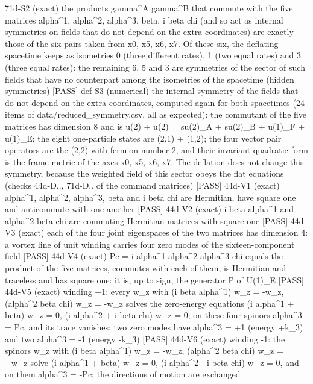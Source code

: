 \documentclass[
  10pt,
]{article}
\newenvironment{Shaded}{}{}
\newcommand{\NormalTok}[1]{#1}
\begin{document}
\begin{Shaded}
\begin{Highlighting}[]
\NormalTok{[PASS] 71d{-}S2  (exact) the products gamma\^{}A gamma\^{}B that commute with the five matrices alpha\^{}1, alpha\^{}2, alpha\^{}3, beta, i beta chi (and so act as internal symmetries on fields that do not depend on the extra coordinates) are exactly those of the six pairs taken from x0, x5, x6, x7. Of these six, the deflating spacetime keeps as isometries 0 (three different rates), 1 (two equal rates) and 3 (three equal rates): the remaining 6, 5 and 3 are symmetries of the sector of such fields that have no counterpart among the isometries of the spacetime (hidden symmetries)}
\NormalTok{[PASS] def{-}S3  (numerical) the internal symmetry of the fields that do not depend on the extra coordinates, computed again for both spacetimes (24 items of data/reduced\_symmetry.csv, all as expected): the commutant of the five matrices has dimension 8 and is u(2) + u(2) = su(2)\_A + su(2)\_B + u(1)\_F + u(1)\_E; the eight one{-}particle states are (2,1) + (1,2); the four vector pair operators are the (2,2) with fermion number 2, and their invariant quadratic form is the frame metric of the axes x0, x5, x6, x7. The deflation does not change this symmetry, because the weighted field of this sector obeys the flat equations (checks 44d{-}D.., 71d{-}D.. of the command matrices)}
\NormalTok{[PASS] 44d{-}V1  (exact) alpha\^{}1, alpha\^{}2, alpha\^{}3, beta and i beta chi are Hermitian, have square one and anticommute with one another}
\NormalTok{[PASS] 44d{-}V2  (exact) i beta alpha\^{}1 and alpha\^{}2 beta chi are commuting Hermitian matrices with square one}
\NormalTok{[PASS] 44d{-}V3  (exact) each of the four joint eigenspaces of the two matrices has dimension 4: a vortex line of unit winding carries four zero modes of the sixteen{-}component field}
\NormalTok{[PASS] 44d{-}V4  (exact) Pc = i alpha\^{}1 alpha\^{}2 alpha\^{}3 chi equals the product of the five matrices, commutes with each of them, is Hermitian and traceless and has square one: it is, up to sign, the generator P of U(1)\_E}
\NormalTok{[PASS] 44d{-}V5  (exact) winding +1: every w\_z with (i beta alpha\^{}1) w\_z = {-}w\_z, (alpha\^{}2 beta chi) w\_z = {-}w\_z solves the zero{-}energy equations (i alpha\^{}1 + beta) w\_z = 0, (i alpha\^{}2 + i beta chi) w\_z = 0; on these four spinors alpha\^{}3 = Pc, and its trace vanishes: two zero modes have alpha\^{}3 = +1 (energy +k\_3) and two alpha\^{}3 = {-}1 (energy {-}k\_3)}
\NormalTok{[PASS] 44d{-}V6  (exact) winding {-}1: the spinors w\_z with (i beta alpha\^{}1) w\_z = {-}w\_z, (alpha\^{}2 beta chi) w\_z = +w\_z solve (i alpha\^{}1 + beta) w\_z = 0, (i alpha\^{}2 {-} i beta chi) w\_z = 0, and on them alpha\^{}3 = {-}Pc: the directions of motion are exchanged}

\end{Highlighting}
\end{Shaded}
\end{document}
